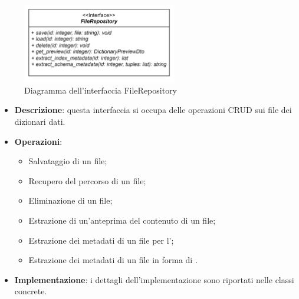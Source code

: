  \label{FileRepository}
\begin{figure}[H]
    \centering
    \includegraphics[width=0.6\textwidth]{assets/Backend/file_repository.png}
    \caption{Diagramma dell'interfaccia FileRepository}
  \end{figure}
\begin{itemize}
  \item \textbf{Descrizione}: questa interfaccia si occupa delle operazioni CRUD sui file dei dizionari dati.
  \item \textbf{Operazioni}: 
    \begin{itemize}
      \item Salvataggio di un file;
      \item Recupero del percorso di un file;
      \item Eliminazione di un file;
      \item Estrazione di un'anteprima del contenuto di un file;
      \item Estrazione dei metadati di un file per l';
      \item Estrazione dei metadati di un file in forma di .
    \end{itemize}
  \item \textbf{Implementazione}: i dettagli dell'implementazione sono riportati nelle classi concrete.
\end{itemize} 